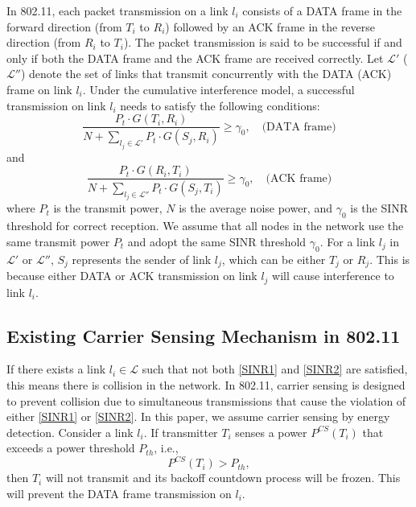 \documentclass[conference]{IEEEtran}
\begin{document}
In 802.11, each packet transmission on a link $l_i$ consists of a
DATA frame in the forward direction (from $T_i$ to $R_i$) followed
by an ACK frame in the reverse direction (from $R_i$ to $T_i$). The
packet transmission is said to be successful if and only if both the
DATA frame and the ACK frame are received correctly. Let
$\mathcal{L}'$ ($\mathcal{L}''$) denote the set of links that
transmit concurrently with the DATA (ACK) frame on link $l_i$. Under
the cumulative interference model, a successful transmission on link
$l_i$ needs to satisfy the following conditions:
\begin{equation} \frac{P_t\cdot
G(T_i ,R_i )}{N + \sum\limits_{l_j \in \mathcal{L}'}{P_t\cdot G(S_j
,R_i )} } \ge {\gamma}_0, \quad \text{(DATA frame)}\label{SINR1}
\end{equation}
and
\begin{equation} \frac{P_t\cdot
G(R_i ,T_i )}{N + \sum\limits_{l_j \in \mathcal{L}''}{P_t\cdot G(S_j
,T_i )} } \ge {\gamma}_0, \quad \text{(ACK frame)}\label{SINR2}
\end{equation}
where $P_t$ is the transmit power, $N$ is the average noise power,
and $\gamma_0$ is the SINR threshold for correct reception. We
assume that all nodes in the network use the same transmit power
$P_t$ and adopt the same SINR threshold $\gamma_0$. For a link $l_j$
in $\mathcal{L}'$ or $\mathcal{L}''$, $S_j$ represents the sender of
link $l_j$, which can be either $T_j$ or $R_j$. This is because
either DATA or ACK transmission on link $l_j$ will cause
interference to link $l_i$.





\subsection{Existing Carrier Sensing Mechanism in 802.11}\label{carriersense}

If there exists a link $l_i\in\mathcal{L}$ such that not both
\eqref{SINR1} and \eqref{SINR2} are satisf\/ied, this means there is
collision in the network. In 802.11, carrier sensing is designed to
prevent collision due to simultaneous transmissions that cause the
violation of either \eqref{SINR1} or \eqref{SINR2}. In this paper,
we assume carrier sensing by energy detection. Consider a link
$l_i$. If transmitter $T_i$ senses a power $P^{CS}(T_i)$ that
exceeds a power threshold $P_{th}$, i.e.,
\begin{equation}
P^{CS}(T_i)>P_{th}, \label{eqPcs}
\end{equation}
then $T_i$ will not transmit and its backoff countdown process will
be frozen. This will prevent the DATA frame transmission on $l_i$.
\end{document}
